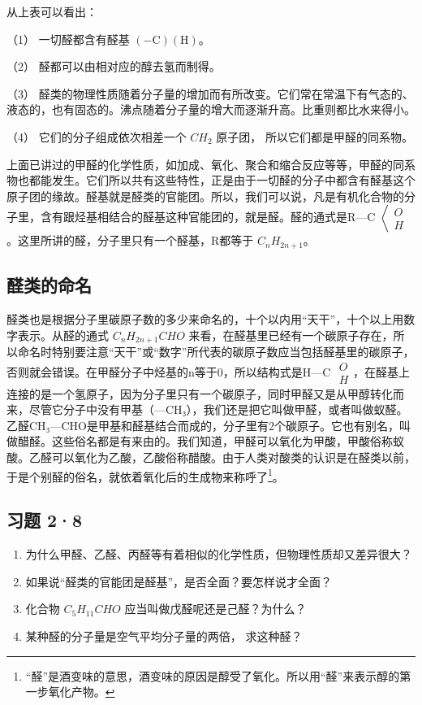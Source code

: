 从上表可以看出：

（1） 一切醛都含有醛基
\(\left(-\mathrm{C}\right)\left(\mathrm{H}\right)\)。

（2） 醛都可以由相对应的醇去氢而制得。

（3）
醛类的物理性质随着分子量的增加而有所改变。它们常在常温下有气态的、液态的，也有固态的。沸点随着分子量的增大而逐渐升高。比重则都比水来得小。

（4） 它们的分子组成依次相差一个 \(CH_{2}\) 原子团，
所以它们都是甲醛的同系物。

上面已讲过的甲醛的化学性质，如加成、氧化、聚合和缩合反应等等，甲醛的同系物也都能发生。它们所以共有这些特性，正是由于一切醛的分子中都含有醛基这个原子团的缘故。醛基就是醛类的官能团。所以，我们可以说，凡是有机化合物的分子里，含有跟烃基相结合的醛基这种官能团的，就是醛。醛的通式是R---C
\(\left\langle\begin{array}{c}O\\H\end{array}\right.\)。这里所讲的醛，分子里只有一个醛基，R都等于
\(C_{n}H_{2n+1}\)。

\subsection{醛类的命名}

醛类也是根据分子里碳原子数的多少来命名的，十个以内用``天干''，十个以上用数字表示。从醛的通式
\(C_{n}H_{2n+1}CHO\)
来看，在醛基里已经有一个碳原子存在，所以命名时特别要注意``天干''或``数字''所代表的碳原子数应当包括醛基里的碳原子，否则就会错误。在甲醛分子中烃基的n等于0，所以结构式是H---C
\(\begin{array}{c}O\\H\end{array}\)，在醛基上连接的是一个氢原子，因为分子里只有一个碳原子，同时甲醛又是从甲醇转化而来，尽管它分子中没有甲基（---CH₃），我们还是把它叫做甲醛，或者叫做蚁醛。乙醛CH₃---CHO是甲基和醛基结合而成的，分子里有2个碳原子。它也有别名，叫做醋醛。这些俗名都是有来由的。我们知道，甲醛可以氧化为甲酸，甲酸俗称蚁酸。乙醛可以氧化为乙酸，乙酸俗称醋酸。由于人类对酸类的认识是在醛类以前，于是个别醛的俗名，就依着氧化后的生成物来称呼了\footnote{``醛''是酒变味的意思，酒变味的原因是醇受了氧化。所以用``醛''来表示醇的第一步氧化产物。}。

\subsection{习题 2·8}

\begin{enumerate}
\item
  为什么甲醛、乙醛、丙醛等有着相似的化学性质，但物理性质却又差异很大？
\item
  如果说``醛类的官能团是醛基''，是否全面？要怎样说才全面？
\item
  化合物 \(C_{5}H_{11}CHO\) 应当叫做戊醛呢还是己醛？为什么？
\item
  某种醛的分子量是空气平均分子量的两倍， 求这种醛？
\end{enumerate}

